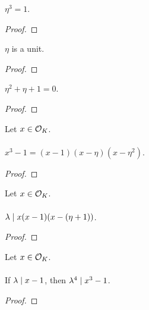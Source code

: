 \begin{lemma}
    \label{lmm:toInteger_cube_eq_one}
    \leanok
    $\eta^3 = 1$.
\end{lemma}
\begin{proof}
    \leanok
\end{proof}

\begin{lemma}
    \label{lmm:eta_isUnit}
    \leanok
    $\eta$ is a unit.
\end{lemma}
\begin{proof}
    \leanok
\end{proof}

\begin{lemma}
    \label{lmm:toInteger_eval_cyclo}
    \leanok
    $\eta^2 + \eta + 1 = 0$.
\end{lemma}
\begin{proof}
    \leanok
\end{proof}

\begin{lemma}
    \label{lmm:cube_sub_one}
    \leanok
    Let $x \in \mathcal{O}_K$. \\\\
    $x^3 - 1 = (x - 1)(x - \eta)(x - \eta^ 2)$.
\end{lemma}
\begin{proof}
    \leanok
\end{proof}

\begin{lemma}
    \label{lmm:lambda_dvd_mul_sub_one_mul_sub_eta_add_one}
    \leanok
    Let $x \in \mathcal{O}_K$. \\\\
    $\lambda \mid x(x - 1)(x - (\eta + 1))$.
\end{lemma}
\begin{proof}
    \leanok
\end{proof}

\begin{lemma}
    \label{lmm:lambda_pow_four_dvd_cube_sub_one_of_dvd_sub_one}
    \leanok
    Let $x \in \mathcal{O}_K$. \\\\
    If $\lambda\mid x - 1$, then $\lambda^ 4 \mid x^3 - 1$.
\end{lemma}
\begin{proof}
    \leanok
\end{proof}

